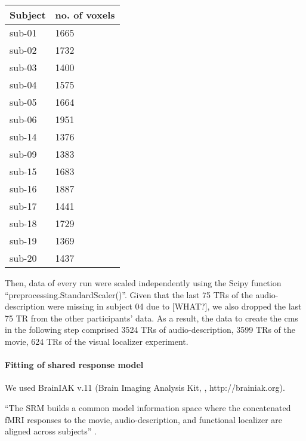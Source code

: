 \begin{table*}[btp]
    \caption{Number of voxels within the union of individual \acp{ppa} that was
    warped from MNI space into each individual's subjects-space.}
\label{tab:ppamaskvoxels}
\begin{tabular}{ll}
\toprule
\textbf{Subject} & \textbf{no. of voxels} \\
\midrule
sub-01 & 1665 \tabularnewline
sub-02 & 1732 \tabularnewline
sub-03 & 1400 \tabularnewline
sub-04 & 1575 \tabularnewline
sub-05 & 1664 \tabularnewline
sub-06 & 1951 \tabularnewline
sub-14 & 1376 \tabularnewline
sub-09 & 1383 \tabularnewline
sub-15 & 1683 \tabularnewline
sub-16 & 1887 \tabularnewline
sub-17 & 1441 \tabularnewline
sub-18 & 1729 \tabularnewline
sub-19 & 1369 \tabularnewline
sub-20 & 1437 \tabularnewline
\bottomrule
\end{tabular}
\end{table*}

Then, data of every run were scaled independently using the Scipy function
``preprocessing.StandardScaler()''.
Given that the last 75 TRs of the audio-description were missing in subject 04
due to [WHAT?], we also dropped the last 75 TR from the other participants'
data.
As a result, the data to create the \ac{cms} in the following step comprised
3524 TRs of audio-description, 3599 TRs of the movie, 624 TRs of the visual
localizer experiment.



\paragraph{Fitting of shared response model}



We used BrainIAK v.11 (Brain Imaging Analysis Kit, \citet{kumar2020brainiak,
kumar2020brainiaktutorial}, http://brainiak.org).

%
``The SRM builds a common model information space where the concatenated fMRI
responses to the movie, audio-description, and functional localizer are aligned
across subjects'' \citep{jiahui2020predicting}.

